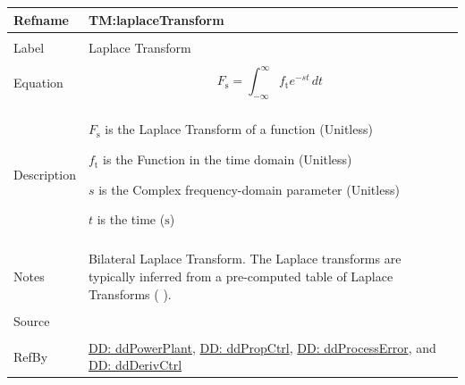 \documentclass[12pt]{article}
\begin{document}
\vspace{\baselineskip}
\noindent
\begin{minipage}{\textwidth}
\begin{tabular}{>{\raggedright}p{}>{\raggedright\arraybackslash}p{}}
\toprule \textbf{Refname} & \textbf{TM:laplaceTransform}
\label{TM:laplaceTransform}
\\ \midrule \\
Label & Laplace Transform
        
\\ \midrule \\
Equation & \begin{displaymath}
           {F_{\text{s}}}=\int_{-∞}^{∞}{{f_{\text{t}}} e^{-s t}}\,dt
           \end{displaymath}
\\ \midrule \\
Description & \begin{symbDescription}
              \item{${F_{\text{s}}}$ is the Laplace Transform of a function (Unitless)}
              \item{${f_{\text{t}}}$ is the Function in the time domain (Unitless)}
              \item{$s$ is the Complex frequency-domain parameter (Unitless)}
              \item{$t$ is the time (${\text{s}}$)}
              \end{symbDescription}
\\ \midrule \\
Notes & Bilateral Laplace Transform. The Laplace transforms are  typically inferred from a pre-computed table of Laplace Transforms  ( \cite{laplaceWiki} ).
        
\\ \midrule \\
Source & \cite{laplaceWiki}
         
\\ \midrule \\
RefBy & \hyperref[DD:ddPowerPlant]{DD: ddPowerPlant}, \hyperref[DD:ddPropCtrl]{DD: ddPropCtrl}, \hyperref[DD:ddProcessError]{DD: ddProcessError}, and \hyperref[DD:ddDerivCtrl]{DD: ddDerivCtrl}
        
\\ \bottomrule
\end{tabular}
\end{minipage}
\vspace{\baselineskip}
\end{document}

